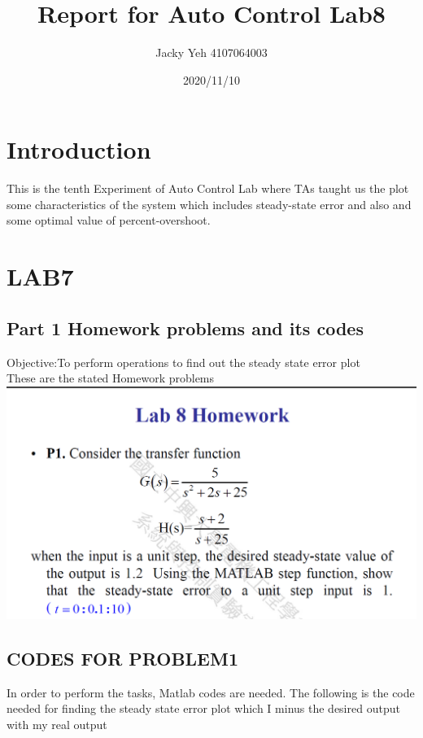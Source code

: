\documentclass[12pt]{article}
\title{Report for Auto Control Lab8}
\date{2020/11/10}
\author{Jacky Yeh 4107064003}
\begin{document}
\begin{titlepage}

\maketitle
\end{titlepage}


\section{Introduction}
This is the tenth Experiment of Auto Control Lab where TAs taught us the plot some characteristics of the system which includes steady-state error and also and some optimal value of percent-overshoot.


\section{LAB7}
\subsection{Part 1 Homework problems and its codes}
Objective:To perform operations to find out the steady state error plot\\

These are the stated Homework problems\\

\includegraphics[scale=0.6]{../Lab8/Pictures/LabProblem1.png} \\

\cleardoublepage

\subsection{CODES FOR PROBLEM1}
In order to perform the tasks, Matlab codes are needed. The following is the code needed for finding the steady state error plot which I minus the desired output with my real output\\
\end{document}
